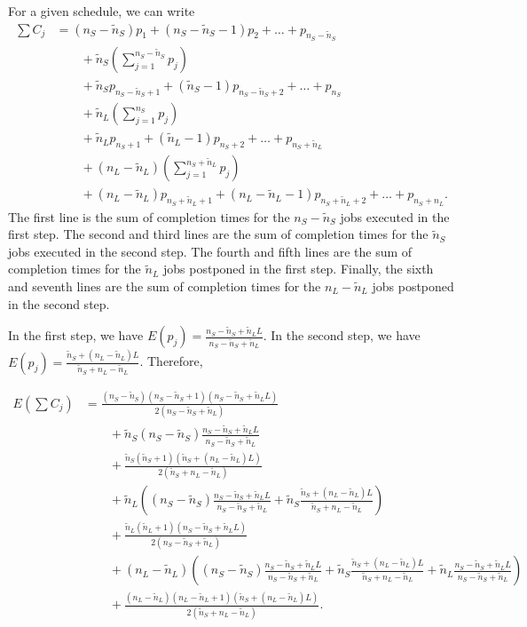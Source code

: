 \documentclass{article}
\begin{document}
For a given schedule, we can write
\begin{align*}
    \sum C_j
        &=(n_S-\tilde{n}_S)p_1+(n_S-\tilde{n}_S-1)p_2+\ldots+p_{n_S-\tilde{n}_S}\\
        &\qquad+\tilde{n}_S(\sum\limits_{j=1}^{n_S-\tilde{n}_S} p_j)\\
        &\qquad+\tilde{n}_Sp_{n_S-\tilde{n}_S+1}+(\tilde{n}_S-1)p_{n_S-\tilde{n}_S+2}+\ldots+p_{n_S}\\
        &\qquad+\tilde{n}_L(\sum\limits_{j=1}^{n_S} p_j)\\
        &\qquad+\tilde{n}_Lp_{n_S+1}+(\tilde{n}_L-1)p_{n_S+2}+\ldots+p_{n_S+\tilde{n}_L}\\
        &\qquad+(n_L-\tilde{n}_L)(\sum\limits_{j=1}^{n_S+\tilde{n}_L} p_j)\\
        &\qquad+(n_L-\tilde{n}_L)p_{n_S+\tilde{n}_L+1}+(n_L-\tilde{n}_L-1)p_{n_S+\tilde{n}_L+2}+\ldots+p_{n_S+n_L}.
\end{align*}
The first line is the sum of completion times for the \(n_S-\tilde{n}_S\) jobs executed in the first
step. The second and third lines are the sum of completion times for the \(\tilde{n}_S\) jobs
executed in the second step. The fourth and fifth lines are the sum of completion times for the
\(\tilde{n}_L\) jobs postponed in the first step. Finally, the sixth and seventh lines are the sum
of completion times for the \(n_L-\tilde{n}_L\) jobs postponed in the second step.

In the first step, we have
\(E(p_j)=\frac{n_S-\tilde{n}_S+\tilde{n}_LL}{n_S-\tilde{n}_S+\tilde{n}_L}\). In the second step, we
have \(E(p_j)=\frac{\tilde{n}_S+(n_L-\tilde{n}_L)L}{\tilde{n}_S+n_L-\tilde{n}_L}\). Therefore,

\begin{align*}
    E(\sum C_j)
        &=\frac{(n_S-\tilde{n}_S)(n_S-\tilde{n}_S+1)(n_S-\tilde{n}_S+\tilde{n}_LL)}{2(n_S-\tilde{n}_S+\tilde{n}_L)}\\
        &\qquad+\tilde{n}_S(n_S-\tilde{n}_S)\frac{n_S-\tilde{n}_S+\tilde{n}_LL}{n_S-\tilde{n}_S+\tilde{n}_L}\\
        &\qquad+\frac{\tilde{n}_S(\tilde{n}_S+1)(\tilde{n}_S+(n_L-\tilde{n}_L)L)}{2(\tilde{n}_S+n_L-\tilde{n}_L)}\\
        &\qquad+\tilde{n}_L((n_S-\tilde{n}_S)\frac{n_S-\tilde{n}_S+\tilde{n}_LL}{n_S-\tilde{n}_S+\tilde{n}_L}+\tilde{n}_S\frac{\tilde{n}_S+(n_L-\tilde{n}_L)L}{\tilde{n}_S+n_L-\tilde{n}_L})\\
        &\qquad+\frac{\tilde{n}_L(\tilde{n}_L+1)(n_S-\tilde{n}_S+\tilde{n}_LL)}{2(n_S-\tilde{n}_S+\tilde{n}_L)}\\
        &\qquad+(n_L-\tilde{n}_L)((n_S-\tilde{n}_S)\frac{n_S-\tilde{n}_S+\tilde{n}_LL}{n_S-\tilde{n}_S+\tilde{n}_L}+\tilde{n}_S\frac{\tilde{n}_S+(n_L-\tilde{n}_L)L}{\tilde{n}_S+n_L-\tilde{n}_L}+\tilde{n}_L\frac{n_S-\tilde{n}_S+\tilde{n}_LL}{n_S-\tilde{n}_S+\tilde{n}_L})\\
        &\qquad+\frac{(n_L-\tilde{n}_L)(n_L-\tilde{n}_L+1)(\tilde{n}_S+(n_L-\tilde{n}_L)L)}{2(\tilde{n}_S+n_L-\tilde{n}_L)}.
\end{align*}
\end{document}
